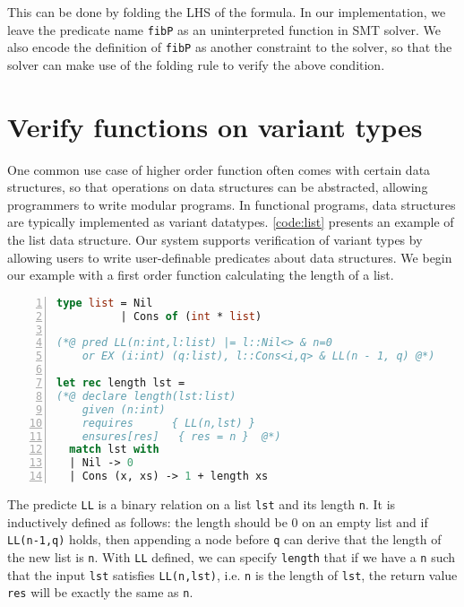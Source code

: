 This can be done by folding the LHS of the formula. In our implementation, we leave the predicate name \texttt{fibP} as an uninterpreted function in SMT solver. We also encode the definition of \texttt{fibP} as another constraint to the solver, so that the solver can make use of the folding rule to verify the above condition.




\section{Verify functions on variant types}

One common use case of higher order function often comes with certain data structures, so that operations on data structures can be abstracted, allowing programmers to write modular programs.
In functional programs, data structures are typically implemented as variant datatypes. \autoref{code:list} presents an example of the list data structure.
Our system supports verification of variant types by allowing users to write
user-definable predicates about data structures. We begin our example with a
first order function calculating the length of a list.


\begin{lstlisting}[language=Caml, mathescape=true, xleftmargin=2em, aboveskip=1em, xrightmargin=1em, numbers=left, frame = {TB}, caption=Use inductive predicates to specify functions on variant types, label=code:list]
type list = Nil
          | Cons of (int * list)

(*@ pred LL(n:int,l:list) |= l::Nil<> & n=0
    or EX (i:int) (q:list), l::Cons<i,q> & LL(n - 1, q) @*)

let rec length lst =
(*@ declare length(lst:list)
    given (n:int)
    requires      { LL(n,lst) }
    ensures[res]   { res = n }  @*)
  match lst with
  | Nil -> 0
  | Cons (x, xs) -> 1 + length xs
\end{lstlisting}


The predicte \texttt{LL} is a binary relation on a list \texttt{lst} and its length \texttt{n}. It is inductively defined as follows: the length should be 0 on an empty list and if \texttt{LL(n-1,q)} holds, then appending a node before \texttt{q} can derive that the length of the new list is \texttt{n}. With \texttt{LL} defined, we can specify \texttt{length} that if we have a \texttt{n} such that the input \texttt{lst} satisfies \texttt{LL(n,lst)}, i.e. \texttt{n} is the length of \texttt{lst}, the return value \texttt{res} will be exactly the same as \texttt{n}.

